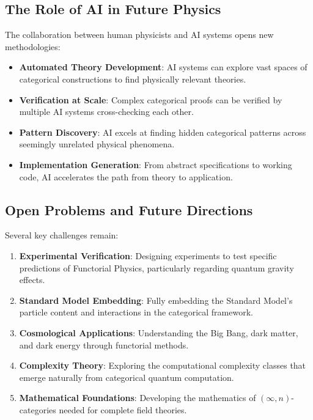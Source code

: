 \subsection{The Role of AI in Future Physics}

The collaboration between human physicists and AI systems opens new methodologies:

\begin{itemize}[leftmargin=*]
\item \textbf{Automated Theory Development}: AI systems can explore vast spaces of categorical constructions to find physically relevant theories.

\item \textbf{Verification at Scale}: Complex categorical proofs can be verified by multiple AI systems cross-checking each other.

\item \textbf{Pattern Discovery}: AI excels at finding hidden categorical patterns across seemingly unrelated physical phenomena.

\item \textbf{Implementation Generation}: From abstract specifications to working code, AI accelerates the path from theory to application.
\end{itemize}

\subsection{Open Problems and Future Directions}

Several key challenges remain:

\begin{enumerate}[leftmargin=*]
\item \textbf{Experimental Verification}: Designing experiments to test specific predictions of Functorial Physics, particularly regarding quantum gravity effects.

\item \textbf{Standard Model Embedding}: Fully embedding the Standard Model's particle content and interactions in the categorical framework.

\item \textbf{Cosmological Applications}: Understanding the Big Bang, dark matter, and dark energy through functorial methods.

\item \textbf{Complexity Theory}: Exploring the computational complexity classes that emerge naturally from categorical quantum computation.

\item \textbf{Mathematical Foundations}: Developing the mathematics of $(\infty,n)$-categories needed for complete field theories.
\end{enumerate}

